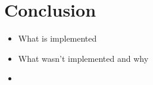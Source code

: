 \chapter*{Conclusion}
\label{chap:Conclusion}

\begin{itemize}
	\item What is implemented
	\item What wasn't implemented and why
	\item 
\end{itemize}